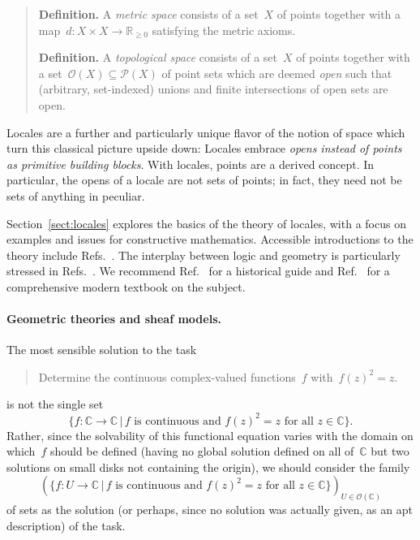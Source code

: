 \documentclass{ws-rv9x6}
\renewcommand{\O}{\mathcal{O}}
\newcommand{\RR}{\mathbb{R}}
\newcommand{\CC}{\mathbb{C}}
\renewcommand{\P}{\mathcal{P}}
\renewcommand{\_}{\mathpunct{.}}
\newcommand{\?}{\,{:}\,}
\begin{document}
\begin{quote}
\textbf{Definition.} A \emph{metric space} consists of a set~$X$ of points
together with a map~$d : X \times X \to \RR_{\geq 0}$ satisfying the metric
axioms.

\textbf{Definition.} A \emph{topological space} consists of a set~$X$ of points
together with a set~$\O(X) \subseteq \P(X)$ of point sets which are deemed
\emph{open} such that (arbitrary, set-indexed) unions and finite intersections
of open sets are open.
\end{quote}

Locales are a further and particularly unique flavor of the notion of space
which turn this classical picture upside down: Locales embrace \emph{opens
instead of points as primitive building blocks}. With locales, points are a
derived concept. In particular, the opens of a locale are not sets of points;
in fact, they need not be sets of anything in peculiar.

Section~\ref{sect:locales} explores the basics of the theory of locales, with a
focus on examples and issues for constructive mathematics. Accessible
introductions to the theory include
Refs.~. The interplay between logic and
geometry is particularly stressed in
Refs.~. We recommend
Ref.~ for a historical guide and
Ref.~ for a comprehensive modern
textbook on the subject.


\paragraph{Geometric theories and sheaf models.} The most sensible solution to
the task
\begin{quote}
Determine the continuous complex-valued functions~$f$ with~$f(z)^2 = z$.
\end{quote}
is not the single set
\[ \{ f : \CC \to \CC \,|\, \text{$f$ is continuous and $f(z)^2 = z$ for all~$z \in \CC$} \}. \]
Rather, since the solvability of this functional equation varies with the
domain on which~$f$ should be defined (having no global solution defined on all
of~$\CC$ but two solutions on small disks not containing the origin), we should
consider the family
\[ (\{ f : U \to \CC \,|\, \text{$f$ is continuous and $f(z)^2 = z$ for all~$z
\in \CC$} \})_{U \in \O(\CC)} \]
of sets as the solution (or perhaps, since no solution was actually given, as
an apt description) of the task.
\end{document}
